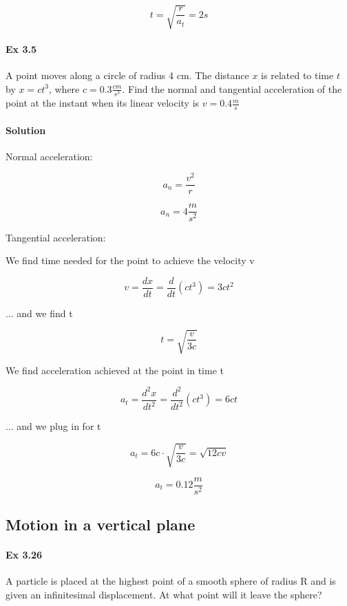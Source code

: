 \documentclass{article}
\begin{document}
\[ t = \sqrt{\frac{r}{a_t}} = 2s \]


\paragraph{Ex 3.5}
A point moves along a circle of radius 4 cm. The distance $x$ is related to time $t$ by $x = ct^3$, where $c = 0.3 \frac{cm}{s^3}$. Find the normal and tangential acceleration of the point at the instant when its linear velocity is $v = 0.4 \frac{m}{s}$
\paragraph{Solution}

Normal acceleration:

\[ a_n = \frac{v^2}{r} \]

\[ a_n = 4 \frac{m}{s^2} \]

Tangential acceleration:

We find time needed for the point to achieve the velocity v

\[ v = \frac{dx}{dt} = \frac{d}{dt}(ct^3) = 3ct^2 \]

... and we find t

\[ t = \sqrt{\frac{v}{3c}} \]

We find acceleration achieved at the point in time t

\[ a_t = \frac{d^2x}{dt^2} = \frac{d^2}{dt^2}(ct^3) = 6ct \]

... and we plug in for t

\[ a_t = 6c \cdot \sqrt{\frac{v}{3c}} = \sqrt{12cv} \]

\[ a_t = 0.12 \frac{m}{s^2} \]


\subsection{Motion in a vertical plane}


\paragraph{Ex 3.26}
A particle is placed at the highest point of a smooth sphere of radius R and is given an infinitesimal displacement. At what point will it leave the sphere?
\end{document}
